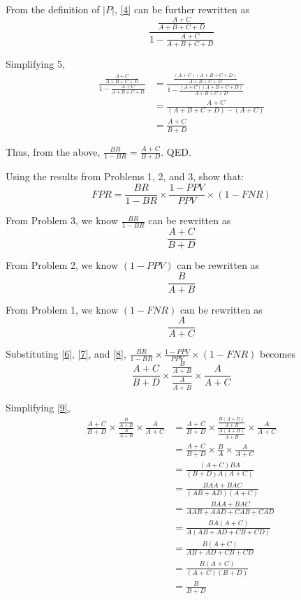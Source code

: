 \documentclass{cisXXX} %
\begin{document}
From the definition of $|P|$, \eqref{4} can be further rewritten as
\begin{equation}
\label{5} \frac{\frac{A+C}{A+B+C+D}}{1-\frac{A+C}{A+B+C+D}}
\end{equation}

Simplifying 5,
\begin{align*}
\frac{\frac{A+C}{A+B+C+D}}{1-\frac{A+C}{A+B+C+D}} &= \frac{\frac{(A+C)(A+B+C+D)}{A+B+C+D}}{1-\frac{(A+C)(A+B+C+D)}{A+B+C+D}}\\
&= \frac{A+C}{(A+B+C+D) - (A+C)}\\
&= \frac{A+C}{B+D}
\end{align*}

Thus, from the above, $\frac{BR}{1-BR} = \frac{A+C}{B+D}$. QED.

\HWproblem
Using the results from Problems 1, 2, and 3, show that:
$$FPR = \frac{BR}{1-BR}\times\frac{1-PPV}{PPV}\times(1 -FNR)$$

From Problem 3, we know $\frac{BR}{1-BR}$ can be rewritten as
\begin{equation}
\label{6} \frac{A+C}{B+D}
\end{equation}

From Problem 2, we know $(1-PPV)$ can be rewritten as
\begin{equation}
\label{7} \frac{B}{A+B}
\end{equation}

From Problem 1, we know $(1-FNR)$ can be rewritten as
\begin{equation}
\label{8} \frac{A}{A+C}
\end{equation}

Substituting \eqref{6}, \eqref{7}, and \eqref{8}, $\frac{BR}{1-BR}\times\frac{1-PPV}{PPV}\times(1 -FNR)$ becomes
\begin{equation}
\label{9} \frac{A+C}{B+D}\times\frac{\frac{B}{A+B}}{\frac{A}{A+B}}\times\frac{A}{A+C}
\end{equation}

Simplifying \eqref{9},
\begin{align*}
\frac{A+C}{B+D}\times\frac{\frac{B}{A+B}}{\frac{A}{A+B}}\times\frac{A}{A+C} &= \frac{A+C}{B+D}\times\frac{\frac{B(A+D)}{A+B}}{\frac{A(A+B)}{A+B}}\times\frac{A}{A+C}\\
&= \frac{A+C}{B+D}\times\frac{B}{A}\times\frac{A}{A+C}\\
&= \frac{(A+C)BA}{(B+D)A(A+C)}\\
&= \frac{BAA+BAC}{(AB+AD)(A+C)}\\
&= \frac{BAA+BAC}{AAB+AAD+CAB+CAD}\\
&= \frac{BA(A+C)}{A(AB+AD+CB+CD)}\\
&= \frac{B(A+C)}{AB+AD+CB+CD}\\
&= \frac{B(A+C)}{(A+C)(B+D)}\\
&= \frac{B}{B+D}
\end{align*}
\end{document}
